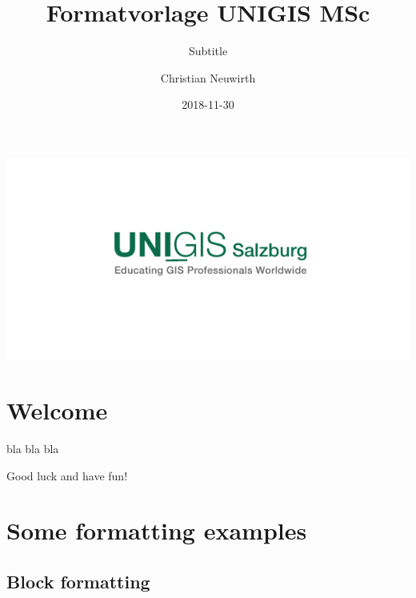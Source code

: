 \documentclass[]{book}
\title{Formatvorlage UNIGIS MSc}
\subtitle{Subtitle}
\author{Christian Neuwirth}
\date{2018-11-30}
\let\oldmaketitle\maketitle
\theoremstyle{definition}
\theoremstyle{definition}
\theoremstyle{definition}
\theoremstyle{remark}
\begin{document}
\maketitle


\thispagestyle{empty}
\begin{center}
\includegraphics[width=\textwidth,height=\textheight,keepaspectratio]{cover/UNIGIS_Salzburg_Schriftlogo.pdf}
\end{center}

\let\maketitle\oldmaketitle
\maketitle

{
\setcounter{tocdepth}{1}
\tableofcontents
}
\chapter*{Welcome}\label{welcome}

bla bla bla

Good luck and have fun!

\chapter{Some formatting examples}\label{some-formatting-examples}

\section{Block formatting}\label{block-formatting}
\end{document}
